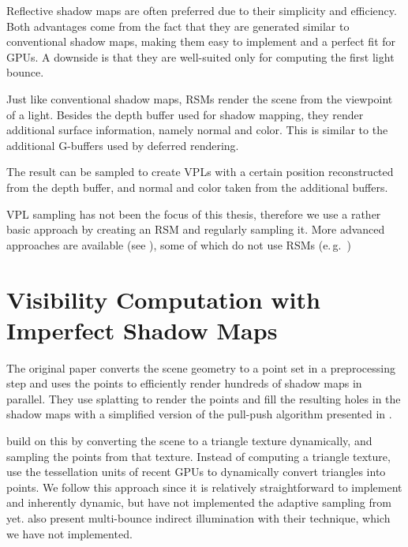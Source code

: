 Reflective shadow maps are often preferred due to their simplicity and efficiency. Both advantages come from the fact that they are generated similar to conventional shadow maps, making them easy to implement and a perfect fit for GPUs. A downside is that they are well-suited only for computing the first light bounce.

Just like conventional shadow maps, RSMs render the scene from the viewpoint of a light. Besides the depth buffer used for shadow mapping, they render additional surface information, namely normal and color. This is similar to the additional G-buffers used by deferred rendering.

The result can be sampled to create VPLs with a certain position reconstructed from the depth buffer, and normal and color taken from the additional buffers.

VPL sampling has not been the focus of this thesis, therefore we use a rather basic approach by creating an RSM and regularly sampling it. More advanced approaches are available (see ), some of which do not use RSMs (e.\,g.\ \cite{hedman2016sequential})


\section{Visibility Computation with Imperfect Shadow Maps}
\label{sec:concept:ism}

The original paper \citep{ritschel2008ism} converts the scene geometry to a point set in a preprocessing step and uses the points to efficiently render hundreds of shadow maps in parallel. They use splatting to render the points and fill the resulting holes in the shadow maps with a simplified version of the pull-push algorithm presented in \citep{Marroquim:2007:reconstruction}.

\citet{ritschel2011ismsViewAdaptive} build on this by converting the scene to a triangle texture dynamically, and sampling the points from that texture. Instead of computing a triangle texture, \citet{barak2013temporally} use the tessellation units of recent GPUs to dynamically convert triangles into points.
We follow this approach since it is relatively straightforward to implement and inherently dynamic, but have not implemented the adaptive sampling from \citet{ritschel2011ismsViewAdaptive} yet.
\citet{ritschel2008ism} also present multi-bounce indirect illumination with their technique, which we have not implemented.

